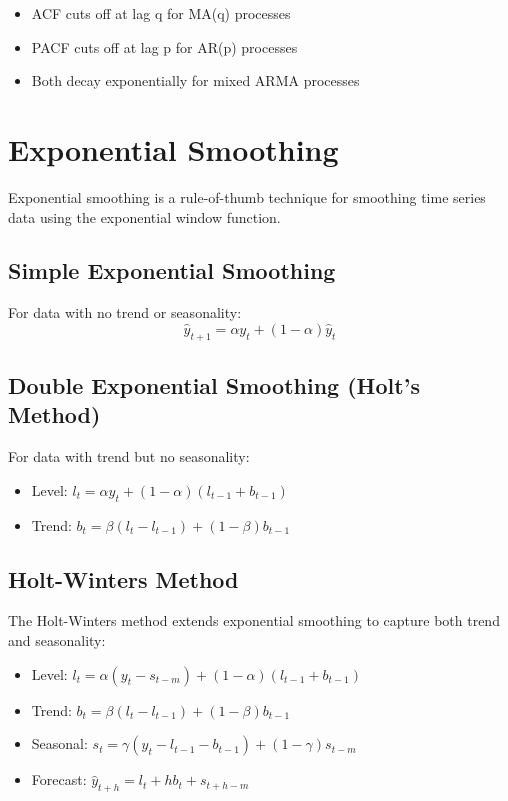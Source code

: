 \documentclass[12pt,a4paper]{report}
\begin{document}
\begin{itemize}
    \item ACF cuts off at lag q for MA(q) processes
    \item PACF cuts off at lag p for AR(p) processes
    \item Both decay exponentially for mixed ARMA processes
\end{itemize}

\section{Exponential Smoothing}
\label{sec:exp_smoothing}
Exponential smoothing is a rule-of-thumb technique for smoothing time series data using the exponential window function.

\subsection{Simple Exponential Smoothing}
For data with no trend or seasonality:
\begin{equation}
\hat{y}_{t+1} = \alpha y_t + (1-\alpha)\hat{y}_t
\end{equation}

\subsection{Double Exponential Smoothing (Holt's Method)}
For data with trend but no seasonality:
\begin{itemize}
    \item Level: $l_t = \alpha y_t + (1-\alpha)(l_{t-1} + b_{t-1})$
    \item Trend: $b_t = \beta(l_t - l_{t-1}) + (1-\beta)b_{t-1}$
\end{itemize}

\subsection{Holt-Winters Method}
The Holt-Winters method extends exponential smoothing to capture both trend and seasonality:

\begin{itemize}
    \item Level: $l_t = \alpha(y_t - s_{t-m}) + (1-\alpha)(l_{t-1} + b_{t-1})$
    \item Trend: $b_t = \beta(l_t - l_{t-1}) + (1-\beta)b_{t-1}$
    \item Seasonal: $s_t = \gamma(y_t - l_{t-1} - b_{t-1}) + (1-\gamma)s_{t-m}$
    \item Forecast: $\hat{y}_{t+h} = l_t + hb_t + s_{t+h-m}$
\end{itemize}
\end{document}
